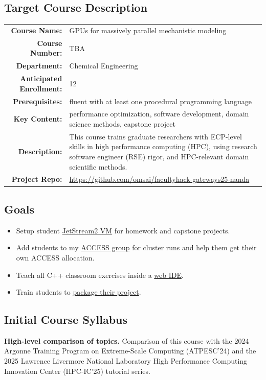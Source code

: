 \documentclass{article}
\renewcommand{\small}{\fontsize{20.74}{25}\selectfont}
\newcommand{\sectionbox}[1]{%
  \begin{tcolorbox}[sharp corners,boxrule=0pt,top=15pt,colback=fh-blue,coltext=fh-gold]%
    \section*{#1\vphantom{Yy}}%
  \end{tcolorbox}%
}
\begin{document}
\begin{multicols}{2}
  \subsection*{\textcolor{fh-blue}{Target Course Description}}

  {
    \begin{tabularx}{\linewidth}{>{\bfseries}r X}
      \toprule
      Course Name:
      & GPUs for massively parallel mechanistic modeling\\
      Course Number:
      & TBA\\
      Department:
      & Chemical Engineering\\
      Anticipated Enrollment:
      & 12\\
      Prerequisites:
      & fluent with at least one %
      procedural programming language\\
      Key Content:
      & performance optimization, %
      software development, %
      domain science methods, %
      capstone project\\
      Description:
      & This course trains graduate researchers %
      with ECP-level skills in high performance computing (HPC), %
      using research software engineer (RSE) rigor, %
      and HPC-relevant domain scientific methods.\\
      Project Repo:
      & \small \url{https://github.com/omsai/facultyhack-gateways25-nanda}\\
      \bottomrule
    \end{tabularx}
  }

  \subsection*{\textcolor{fh-blue}{Goals}}
  \begin{itemize}
  \item Setup student \ul{JetStream2 VM} for homework and capstone projects.
  \item Add students to my \ul{ACCESS group} for cluster runs and %
    help them get their own ACCESS allocation.
  \item Teach all C++ classroom exercises inside a \ul{web IDE}. 
  \item Train students to \ul{package their project}.
  \end{itemize}

  \sectionbox{Initial Course Syllabus}%
  \noindent
    \textbf{High-level comparison of topics.}
        Comparison of this course with the %
        2024 Argonne Training Program on Extreme-Scale Computing (ATPESC'24) %
        and the 2025 Lawrence Livermore National Laboratory %
        High Performance Computing Innovation Center (HPC-IC'25) %
        tutorial series.
        \medskip


\end{multicols}
\end{document}
